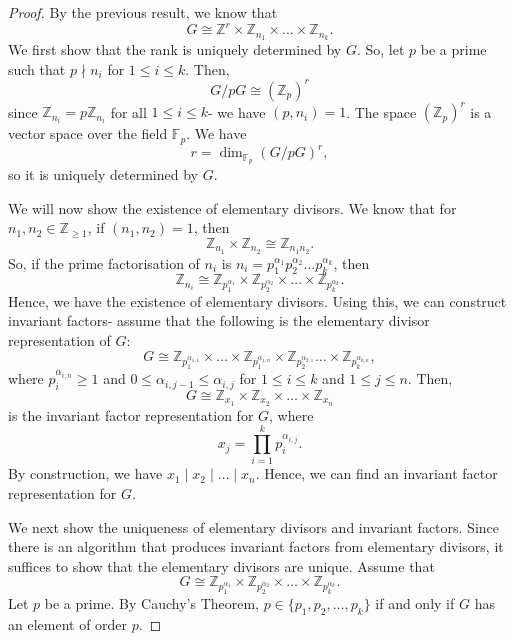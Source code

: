 \documentclass[a4paper, openany]{memoir}
\theoremstyle{definition}
\theoremstyle{plain}
\begin{document}
    \begin{proof}
        By the previous result, we know that
        \[G \cong \mathbb{Z}^r \times \mathbb{Z}_{n_1} \times \dots \times \mathbb{Z}_{n_k}.\]
        We first show that the rank is uniquely determined by $G$. So, let $p$ be a prime such that $p \nmid n_i$ for $1 \leq i \leq k$. Then, 
        \[G/pG \cong (\mathbb{Z}_p)^r\]
        since $\mathbb{Z}_{n_i} = p\mathbb{Z}_{n_i}$ for all $1 \leq i \leq k$- we have $(p, n_i) = 1$. The space $(\mathbb{Z}_p)^r$ is a vector space over the field $\mathbb{F}_p$. We have
        \[r = \dim_{\mathbb{F}_p} (G/pG)^r,\]
        so it is uniquely determined by $G$.
        
        We will now show the existence of elementary divisors. We know that for $n_1, n_2 \in \mathbb{Z}_{\geq 1}$, if $(n_1, n_2) = 1$, then
        \[\mathbb{Z}_{n_1} \times \mathbb{Z}_{n_2} \cong \mathbb{Z}_{n_1 n_2}.\]
        So, if the prime factorisation of $n_i$ is $n_i = p_1^{\alpha_1} p_2^{\alpha_2} \dots p_k^{\alpha_k}$, then
        \[\mathbb{Z}_{n_i} \cong \mathbb{Z}_{p_1^{\alpha_1}} \times \mathbb{Z}_{p_2^{\alpha_2}} \times \dots \times \mathbb{Z}_{p_k^{\alpha_k}}.\]
        Hence, we have the existence of elementary divisors. Using this, we can construct invariant factors- assume that the following is the elementary divisor representation of $G$:
        \[G \cong \mathbb{Z}_{p_1^{\alpha_{1, 1}}} \times \dots \times \mathbb{Z}_{p_1^{\alpha_{1, n}}} \times \mathbb{Z}_{p_2^{\alpha_{2, 1}}} \dots \times \mathbb{Z}_{p_k^{\alpha_{k, n}}},\]
        where $p_i^{\alpha_{i, n}} \geq 1$ and $0 \leq \alpha_{i, j-1} \leq \alpha_{i, j}$ for $1 \leq i \leq k$ and $1 \leq j \leq n$. Then,
        \[G \cong \mathbb{Z}_{x_1} \times \mathbb{Z}_{x_2} \times \dots \times \mathbb{Z}_{x_n}\]
        is the invariant factor representation for $G$, where
        \[x_j = \prod_{i=1}^k p_i^{\alpha_{i, j}}.\]
        By construction, we have $x_1 \mid x_2 \mid \dots \mid x_n$. Hence, we can find an invariant factor representation for $G$.

        We next show the uniqueness of elementary divisors and invariant factors. Since there is an algorithm that produces invariant factors from elementary divisors, it suffices to show that the elementary divisors are unique. Assume that 
        \[G \cong \mathbb{Z}_{p_1^{\alpha_1}} \times \mathbb{Z}_{p_2^{\alpha_2}} \times \dots \times \mathbb{Z}_{p_k^{\alpha_k}}.\]
        Let $p$ be a prime. By Cauchy's Theorem, $p \in \{p_1, p_2, \dots, p_k\}$ if and only if $G$ has an element of order $p$.
    \end{proof}
\end{document}
